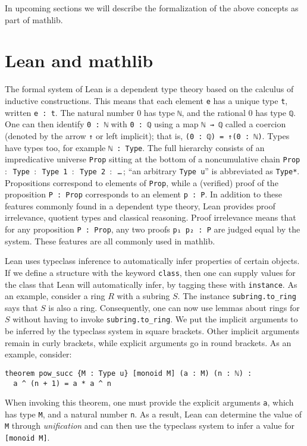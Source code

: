 \documentclass[sn-mathphys]{sn-jnl}%
\newcommand{\lean}[1]{\texttt{#1}\xspace}
\newcommand{\mathlib}{\textsf{mathlib}\xspace}
\begin{document}
In upcoming sections we will describe the formalization of the above concepts as part of \mathlib.

\section{Lean and \mathlib} \label{sec:lean-mathlib}

The formal system of Lean is a dependent type theory based on the calculus of inductive constructions.
This means that each element \lean{e} has a unique type \lean{t}, written \lean{e : t}.
The natural number 0 has type \lean{ℕ}, and the rational 0 has type \lean{ℚ}.
One can then identify \lean{0 : ℕ} with \lean{0 : ℚ} using a map \lean{ℕ → ℚ} called a coercion (denoted by the arrow \lean{↑} or left implicit);
that is, \lean{(0 : ℚ) = ↑(0 : ℕ)}.
Types have types too, for example \lean{ℕ : Type}.
The full hierarchy consists of an impredicative universe \lean{Prop} sitting at the bottom of a noncumulative chain \lean{Prop $:$ Type $:$ Type 1 $:$ \mbox{Type 2} $:$ \dots}\,;
``an arbitrary \lean{Type u}'' is abbreviated as \lean{Type*}.
Propositions correspond to elements of \lean{Prop}, while a (verified) proof of the proposition \lean{P : Prop} corresponds to an element \mbox{\lean{p : P}}.
In addition to these features commonly found in a dependent type theory, Lean provides proof irrelevance, quotient types and classical reasoning.
Proof irrelevance means that for any proposition \lean{P : Prop}, any two proofs \mbox{\lean{p₁ p₂ : P}} are judged equal by the system.
These features are all commonly used in \mathlib.

Lean uses typeclass inference to automatically infer properties of certain objects.
If we define a structure with the keyword \lean{class},
then one can supply values for the class that Lean will automatically infer, by tagging these with \lean{instance}.
As an example, consider a ring $R$ with a subring $S$.
The instance \lean{subring.to\_ring} says that $S$ is also a ring.
Consequently, one can now use lemmas about rings for $S$ without having to invoke \lean{subring.to\_ring}.
We put the implicit arguments to be inferred by the typeclass system in square brackets.
Other implicit arguments remain in curly brackets, while explicit arguments go in round brackets. As an example, consider:
\begin{lstlisting}
theorem pow_succ {M : Type u} [monoid M] (a : M) (n : ℕ) :
  a ^ (n + 1) = a * a ^ n
\end{lstlisting}
When invoking this theorem, one must provide the explicit arguments \lean{a}, which has type \lean{M}, and a natural number \lean{n}.
As a result, Lean can determine the value of \lean{M} through \emph{unification} and can then use the typeclass system to infer a value for \lean{[monoid M]}.
\end{document}
